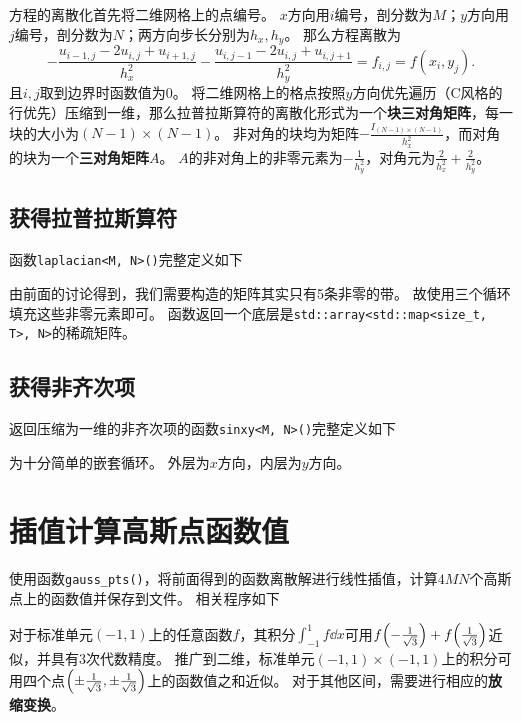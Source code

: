 方程的离散化首先将二维网格上的点编号。
$x$方向用$i$编号，剖分数为$M$；$y$方向用$j$编号，剖分数为$N$；两方向步长分别为$h_x, h_y$。
那么方程离散为
\begin{equation}
    − \frac{u_{i−1,j} − 2u_{i,j} + u_{i+1,j}}{h_x^2}
    − \frac{u_{i,j−1} − 2u_{i,j} + u_{i,j+1}}{h_y^2}
    = f_{i,j} = f(x_i ,y_j).
\end{equation}
且$i, j$取到边界时函数值为0。
将二维网格上的格点按照$y$方向优先遍历（\textsf{C}风格的行优先）压缩到一维，那么拉普拉斯算符的离散化形式为一个\textbf{块三对角矩阵}，每一块的大小为$(N-1)\times(N-1)$。
非对角的块均为矩阵$-\frac{I_{(N-1)\times(N-1)}}{h_x^2}$，而对角的块为一个\textbf{三对角矩阵}$A$。
$A$的非对角上的非零元素为$-\frac{1}{h_y^2}$，对角元为$\frac{2}{h_x^2}+\frac{2}{h_y^2}$。

\subsection{获得拉普拉斯算符}\label{ssec:laplacian}
函数\texttt{laplacian<M, N>()}完整定义如下
{
    \linespread{1.0}
    
}
由前面的讨论得到，我们需要构造的矩阵其实只有5条非零的带。
故使用三个循环填充这些非零元素即可。
函数返回一个底层是\texttt{std::array<std::map<size\_t, T>, N>}的稀疏矩阵。

\subsection{获得非齐次项}\label{ssec:sinxy}
返回压缩为一维的非齐次项的函数\texttt{sinxy<M, N>()}完整定义如下
{
    \linespread{1.0}
    
}
为十分简单的嵌套循环。
外层为$x$方向，内层为$y$方向。

\section{插值计算高斯点函数值}
使用函数\texttt{gauss\_pts()}，将前面得到的函数离散解进行线性插值，计算$4MN$个高斯点上的函数值并保存到文件。
相关程序如下
{
    \linespread{1.0}
    
}

对于标准单元$(-1, 1)$上的任意函数$f$，其积分$\int_{-1}^1 f\dd{x}$可用$f\qty(-\frac{1}{\sqrt{3}}) + f\qty(\frac{1}{\sqrt{3}})$近似，并具有3次代数精度。
推广到二维，标准单元$(-1, 1)\times(-1, 1)$上的积分可用四个点$\qty(\pm\frac{1}{\sqrt{3}}, \pm\frac{1}{\sqrt{3}})$上的函数值之和近似。
对于其他区间，需要进行相应的\textbf{放缩变换}。

